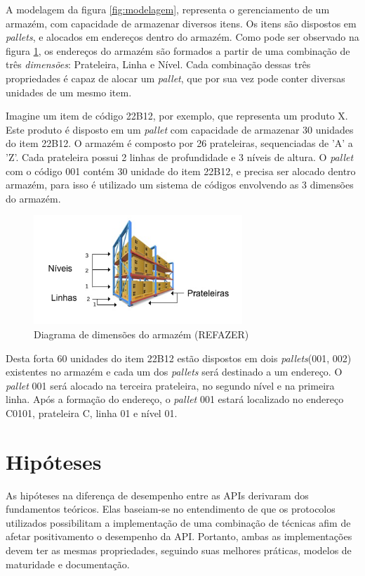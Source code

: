 A modelagem da figura \ref{fig:modelagem}, representa o gerenciamento de um armazém, com capacidade de armazenar diversos itens. Os itens são dispostos em \textit{pallets}, e alocados em endereços dentro do armazém. Como pode ser observado na figura \ref{fig:rack}, os endereços do armazém são formados a partir de uma combinação de três \emph{dimensões}: Prateleira, Linha e Nível. Cada combinação dessas três propriedades é capaz de alocar um \textit{pallet}, que por sua vez pode conter diversas unidades de um mesmo item.

Imagine um item de código 22B12, por exemplo, que representa um produto X. Este produto é disposto em um \textit{pallet} com capacidade de armazenar 30 unidades do item 22B12. O armazém é composto por 26 prateleiras, sequenciadas de 'A' a 'Z'. Cada prateleira possui 2 linhas de profundidade e  3 níveis de altura. O \textit{pallet} com o código 001 contém 30 unidade do item 22B12, e precisa ser alocado dentro armazém, para isso é utilizado um sistema de códigos envolvendo as 3 dimensões do armazém.


\begin{figure}[htbp]
\centering
\includegraphics[width=0.7\textwidth]{figuras/rack.png}
\caption{Diagrama de dimensões do armazém (REFAZER)}
\label{fig:rack}
\author{fonte: Autor}
\end{figure}

Desta forta 60 unidades do item 22B12 estão dispostos em dois \textit{pallets}(001, 002) existentes no armazém e cada um dos \textit{pallets} será destinado a um endereço. O \textit{pallet} 001 será alocado na terceira prateleira, no segundo nível e na primeira linha. Após a formação do endereço, o \textit{pallet} 001 estará localizado no endereço C0101, prateleira C, linha 01 e nível 01.

\section{Hipóteses} \label{sechHipóteses}

As hipóteses na diferença de desempenho entre as APIs derivaram dos fundamentos teóricos. Elas baseiam-se no entendimento de que os protocolos utilizados possibilitam a implementação de uma combinação de técnicas afim de afetar positivamento o desempenho da API. Portanto, ambas as implementações devem ter as mesmas propriedades, seguindo suas melhores práticas, modelos de maturidade e documentação.

